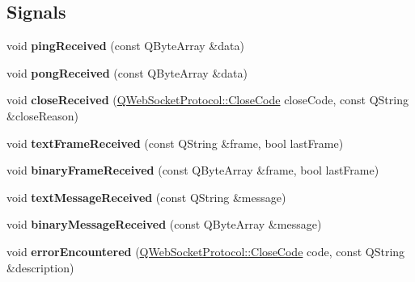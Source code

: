 \subsection*{Signals}
\begin{DoxyCompactItemize}
\item 
\mbox{\label{class_q_web_socket_data_processor_ae305717a87a30fe513de68f3622bbc77}} 
void {\bfseries ping\+Received} (const Q\+Byte\+Array \&data)
\item 
\mbox{\label{class_q_web_socket_data_processor_ae46e061b2351d457931fd1470b8c2816}} 
void {\bfseries pong\+Received} (const Q\+Byte\+Array \&data)
\item 
\mbox{\label{class_q_web_socket_data_processor_a7831f415db378567a094a1bcf8fc1588}} 
void {\bfseries close\+Received} (\mbox{\hyperlink{namespace_q_web_socket_protocol_a9f236676f594451d8d723f260b71028c}{Q\+Web\+Socket\+Protocol\+::\+Close\+Code}} close\+Code, const Q\+String \&close\+Reason)
\item 
\mbox{\label{class_q_web_socket_data_processor_a59547c6bf74b1ecc07e21faa7962c5fa}} 
void {\bfseries text\+Frame\+Received} (const Q\+String \&frame, bool last\+Frame)
\item 
\mbox{\label{class_q_web_socket_data_processor_a49d81d9a2291a25fa42ca8e1bc810bce}} 
void {\bfseries binary\+Frame\+Received} (const Q\+Byte\+Array \&frame, bool last\+Frame)
\item 
\mbox{\label{class_q_web_socket_data_processor_aaca728610e03568e074a3c2ebac2cc8b}} 
void {\bfseries text\+Message\+Received} (const Q\+String \&message)
\item 
\mbox{\label{class_q_web_socket_data_processor_ab256e07223dae23dc4b84ab09b9a015d}} 
void {\bfseries binary\+Message\+Received} (const Q\+Byte\+Array \&message)
\item 
\mbox{\label{class_q_web_socket_data_processor_a93f21142cf8aa5af216e1fb62db4e387}} 
void {\bfseries error\+Encountered} (\mbox{\hyperlink{namespace_q_web_socket_protocol_a9f236676f594451d8d723f260b71028c}{Q\+Web\+Socket\+Protocol\+::\+Close\+Code}} code, const Q\+String \&description)
\end{DoxyCompactItemize}
